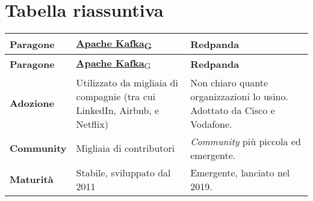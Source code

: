 \section{Tabella riassuntiva}

\begin{longtable}{|>{\centering\arraybackslash}p{}|>{\centering\arraybackslash}p{}|>{\centering\arraybackslash}p{}|}
	\hline
	\textbf{Paragone}                           & \href{https://7last.github.io/docs/rtb/documentazione-interna/glossario\#apache-kafka}{\textbf{Apache Kafka}\textsubscript{G}}                                                                                                                                       & \textbf{Redpanda}                                                                                                                                                      \\
	\hline
	\endfirsthead
	\hline
	\textbf{Paragone}                           & \href{https://7last.github.io/docs/rtb/documentazione-interna/glossario\#apache-kafka}{\textbf{Apache Kafka}\textsubscript{G}}                                                                                                                                       & \textbf{Redpanda}                                                                                                                                                      \\
	\endhead
	\hline
	\textbf{Adozione}                           & Utilizzato da migliaia di compagnie (tra cui LinkedIn, Airbnb, e Netflix)                                                                                   & Non chiaro quante organizzazioni lo usino. Adottato da Cisco e Vodafone.                                                                                               \\
	\hline
	\textbf{Community}                          & Migliaia di contributori                                                                                                                                    & \textit{Community} più piccola ed emergente.                                                                                                                           \\
	\hline
	\textbf{Maturità}                           & Stabile, sviluppato dal 2011                                                                                                                                & Emergente, lanciato nel 2019.                                                                                                                                          \\

\end{longtable}
